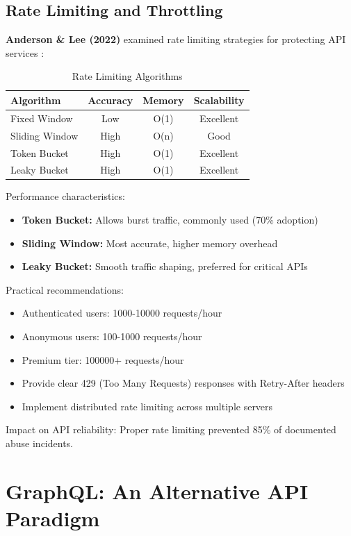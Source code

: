 \documentclass[conference]{IEEEtran}
\begin{document}
\subsection{Rate Limiting and Throttling}

\textbf{Anderson \& Lee (2022)} examined rate limiting strategies for protecting API services \cite{anderson2022rate}:

\begin{table}[h]
\centering
\caption{Rate Limiting Algorithms}
\begin{tabular}{|l|c|c|c|}
\hline
\textbf{Algorithm} & \textbf{Accuracy} & \textbf{Memory} & \textbf{Scalability} \\
\hline
Fixed Window & Low & O(1) & Excellent \\
Sliding Window & High & O(n) & Good \\
Token Bucket & High & O(1) & Excellent \\
Leaky Bucket & High & O(1) & Excellent \\
\hline
\end{tabular}
\end{table}

Performance characteristics:
\begin{itemize}
    \item \textbf{Token Bucket:} Allows burst traffic, commonly used (70\% adoption)
    \item \textbf{Sliding Window:} Most accurate, higher memory overhead
    \item \textbf{Leaky Bucket:} Smooth traffic shaping, preferred for critical APIs
\end{itemize}

Practical recommendations:
\begin{itemize}
    \item Authenticated users: 1000-10000 requests/hour
    \item Anonymous users: 100-1000 requests/hour
    \item Premium tier: 100000+ requests/hour
    \item Provide clear 429 (Too Many Requests) responses with Retry-After headers
    \item Implement distributed rate limiting across multiple servers
\end{itemize}

Impact on API reliability: Proper rate limiting prevented 85\% of documented abuse incidents.

\section{GraphQL: An Alternative API Paradigm}
\end{document}
